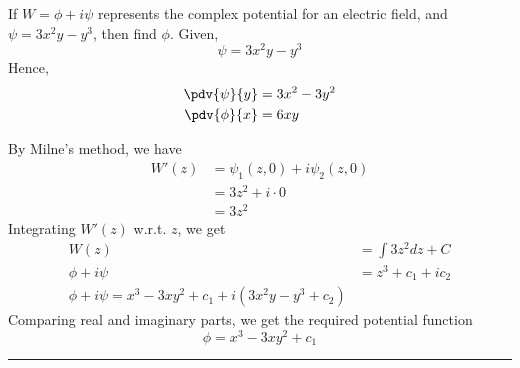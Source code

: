 \begin{example}{
        If $W = \phi + i\psi$ represents the complex potential for an electric field, and $\psi = 3x^2y-y^3$, then find $\phi$.
    }{}
    Given, \[
        \psi = 3x^2y - y^3
    \] Hence,
    \begin{align*}
        \pdv{\psi}{y} &= 3x^2 - 3y^2 \\
        \pdv{\phi}{x} &= 6xy
    \end{align*}
    
    By Milne's method, we have
    \begin{align*}
        W'(z) &= \psi_1(z,0) + i\psi_2(z,0) \\
        &= 3z^2 + i\cdot 0 \\
        &= 3z^2
    \end{align*}
    Integrating $W'(z)$ w.r.t. $z$, we get
    \begin{align*}
        W(z) &= \int 3z^2 dz + C \\
        \phi + i\psi &= z^3 + c_1 + ic_2 \\
        \phi + i\psi = x^3 - 3xy^2 + c_1 + i\left( 3x^2y - y^3 + c_2 \right)
    \end{align*}
    Comparing real and imaginary parts, we get the required potential function \[
        \boxed{ \phi = x^3 - 3xy^2 + c_1 }
    \] 
\end{example}

\vspace{20pt}\rule{3in}{1pt}
